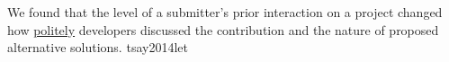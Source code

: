 \documentclass{article}
\begin{document}


  {We found that the level of a submitter's prior interaction on a project changed how \ul{politely} developers discussed the contribution and the nature of proposed alternative solutions.}
  {tsay2014let}



\end{document}
